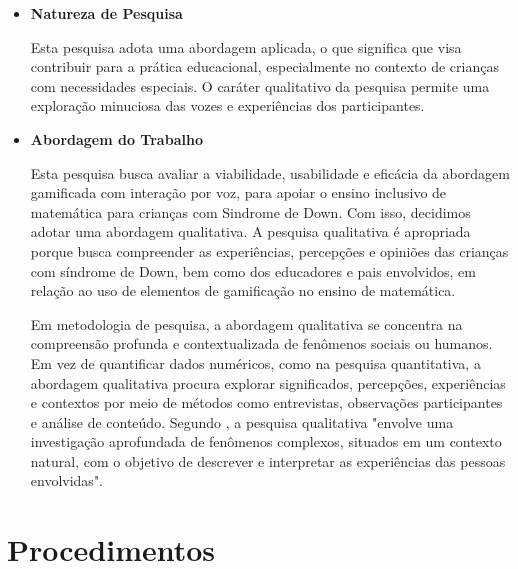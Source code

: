 \begin{itemize}
    \item \textbf{Natureza de Pesquisa}
    
    Esta pesquisa adota uma abordagem aplicada, o que significa que visa contribuir para a prática educacional, especialmente no contexto de crianças com necessidades especiais. O caráter qualitativo da pesquisa permite uma exploração minuciosa das vozes e experiências dos participantes.
    \item \textbf{Abordagem do Trabalho}
    
    Esta pesquisa busca avaliar a viabilidade, usabilidade e eficácia da abordagem gamificada com interação por voz, para apoiar o ensino inclusivo de matemática para crianças com Sindrome de Down. Com isso, decidimos adotar uma abordagem qualitativa. A pesquisa qualitativa é apropriada porque busca compreender as experiências, percepções e opiniões das crianças com síndrome de Down, bem como dos educadores e pais envolvidos, em relação ao uso de elementos de gamificação no ensino de matemática.

Em metodologia de pesquisa, a abordagem qualitativa se concentra na compreensão profunda e contextualizada de fenômenos sociais ou humanos. Em vez de quantificar dados numéricos, como na pesquisa quantitativa, a abordagem qualitativa procura explorar significados, percepções, experiências e contextos por meio de métodos como entrevistas, observações participantes e análise de conteúdo. Segundo \cite{creswell2013research}, a pesquisa qualitativa "envolve uma investigação aprofundada de fenômenos complexos, situados em um contexto natural, com o objetivo de descrever e interpretar as experiências das pessoas envolvidas". 
\end{itemize}

\section{Procedimentos}

